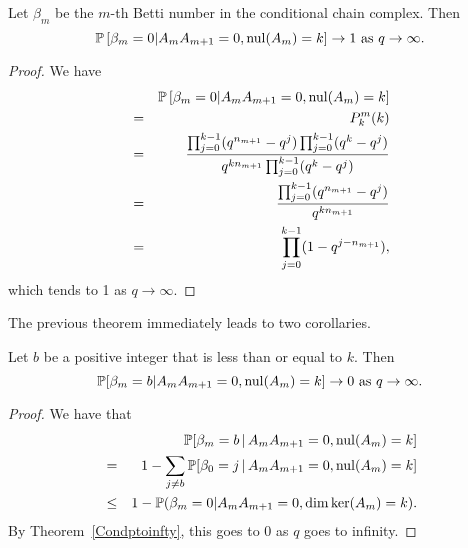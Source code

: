 
\begin{theorem} 
Let $\beta_m$ be the $m$-th Betti number in the conditional chain complex.  Then 
\[
\mathbb{P}\left[\beta_m=0| A_{m}A_{m+1} = 0, \mathrm{nul}(A_{m}) = k \right] \to 1 \textrm{ as } q\to\infty.
\]
\end{theorem}

\begin{proof}\label{Condptoinfty}
We have
	\begin{eqnarray*}
	&&\mathbb{P}\left[\beta_m = 0|A_{m}A_{m+1} = 0, \mathrm{nul}(A_{m}) = k \right]\\ 
    &=& P^m_k(k)\\
    &=& \frac{\prod_{j=0}^{k-1}(q^{n_{m+1}}-q^{j})
		\prod_{j=0}^{k-1}(q^k - q^j )}
		{q^{kn_{m+1}} \prod_{j=0}^{k-1} (q^k-q^j)}\\
		&=& \frac{\prod_{j=0}^{k-1}(q^{n_{m+1}} - q^j)}
		{q^{kn_{m+1}}} \\
		&=& \prod_{j=0}^{k-1} (1-q^{j-n_{m+1}}),
	\end{eqnarray*}
which tends to 1 as $q\to\infty$.  
\end{proof}

The previous theorem immediately leads to two corollaries.  

\begin{corollary}\label{condtozero}
Let $b$ be a positive integer that is less than or equal to $k$. Then 
\[
\mathbb{P}[\beta_m = b| A_{m}A_{m+1} = 0, \mathrm{nul}(A_{m}) = k ] \to 0 \textrm{ as } q\to\infty.
\]
\end{corollary}
\begin{proof}
We have that
	\begin{eqnarray*}
	&&\mathbb{P}[\beta_m = b \,|\, A_{m}A_{m+1} = 0, \mathrm{nul}(A_{m}) = k ]\\
    &=& 1 - \sum_{j\neq b}\mathbb{P}[\beta_0 = j \,|\, A_{m}A_{m+1} = 0, \mathrm{nul}(A_{m}) = k ]\\
    &\leq& 1 - \mathbb{P}(\beta_m = 0|A_{m}A_{m+1} = 0, \dim\ker(A_{m}) = k ).
	\end{eqnarray*}
By Theorem~\ref{Condptoinfty}, this goes to $0$ as $q$ goes to infinity.
\end{proof}

